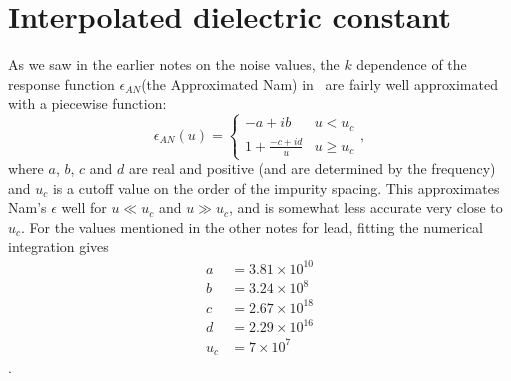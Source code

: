 \documentclass[11pt]{article}
\begin{document}
	\graphicspath{{figures/}}

	\section{Interpolated dielectric constant} \label{sec:bigkinterpolation}

	As we saw in the earlier notes on the noise values, the $k$ dependence of the response function $\epsilon_{AN}$(the Approximated Nam) in~\cite{Nam1967} are fairly well approximated with a piecewise function:
	\begin{equation}
		\epsilon_{AN}(u) =
		\begin{cases}
			-a + i b & u < u_c \\
			1 + \frac{-c + i d}{u} & u \geq u_c
		\end{cases}, \label{eq:epsAN}
	\end{equation}
	where $a$, $b$, $c$ and $d$ are real and positive (and are determined by the frequency) and $u_c$ is a cutoff value on the order of the impurity spacing.
	This approximates Nam's $\epsilon$ well for $u \ll u_c$ and $u \gg u_c$, and is somewhat less accurate very close to $u_c$.
	For the values mentioned in the other notes for lead, fitting the numerical integration gives
	\begin{align}
		a &= 3.81 \times 10^{10} \\
		b &= 3.24 \times 10^{8} \\
		c &= 2.67 \times 10^{18} \\
		d &= 2.29 \times 10^{16} \\
		u_c &= 7 \times 10^{7}
	\end{align}.
\end{document}
